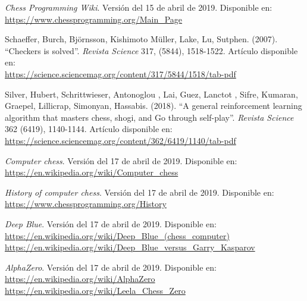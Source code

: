 \documentclass[letterpaper,12pt]{article}
\begin{document}
\begin{thebibliography}{99}

\textit{Chess Programming Wiki}. Versión del 15 de abril de 2019. Disponible en: \\
\url{https://www.chessprogramming.org/Main_Page}

Schaeffer, Burch, Björnsson, Kishimoto Müller, Lake, Lu, Sutphen. (2007). ``Checkers is 
solved''. \textit{Revista Science} 317, (5844), 1518-1522. Artículo disponible en: \\
\url{https://science.sciencemag.org/content/317/5844/1518/tab-pdf}

Silver, Hubert, Schrittwieser, Antonoglou , Lai, Guez, Lanctot , Sifre, Kumaran, 
Graepel, Lillicrap, Simonyan, Hassabis. (2018). ``A general reinforcement learning 
algorithm that masters chess, shogi, and Go through self-play''. \textit{Revista 
Science} 362 (6419), 1140-1144. Artículo disponible en: \\
\url{https://science.sciencemag.org/content/362/6419/1140/tab-pdf}


\textit{Computer chess}. Versión del 17 de abril de 2019. Disponible en: \\
\url{https://en.wikipedia.org/wiki/Computer_chess}

\textit{History of computer chess}. Versión del 17 de abril de 2019. Disponible en: \\
\url{https://www.chessprogramming.org/History}

\textit{Deep Blue}. Versión del 17 de abril de 2019. Disponible en: \\
\url{https://en.wikipedia.org/wiki/Deep_Blue_(chess_computer)} \\
\url{https://en.wikipedia.org/wiki/Deep_Blue_versus_Garry_Kasparov}

\textit{AlphaZero}. Versión del 17 de abril de 2019. Disponible en: \\
\url{https://en.wikipedia.org/wiki/AlphaZero} \\
\url{https://en.wikipedia.org/wiki/Leela_Chess_Zero}


\end{thebibliography}
\end{document}
